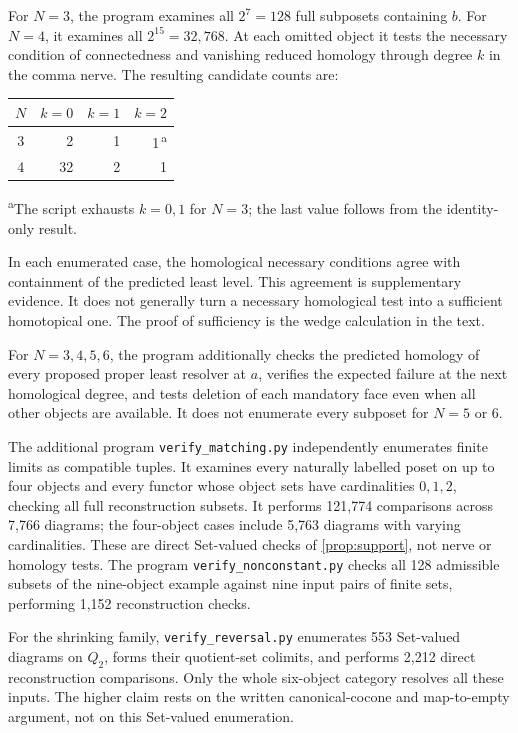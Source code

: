 For $N=3$, the program examines all $2^7=128$ full subposets
containing $b$. For $N=4$, it examines all $2^{15}=32{,}768$. At each
omitted object it tests the necessary condition of connectedness and
vanishing reduced homology through degree $k$ in the comma nerve. The
resulting candidate counts are:
\begin{center}
\begin{tabular}{@{}crrr@{}}
\toprule
$N$ & $k=0$ & $k=1$ & $k=2$\\
\midrule
3 & 2 & 1 & 1\textsuperscript{\,a}\\
4 & 32 & 2 & 1\\
\bottomrule
\end{tabular}\par
\smallskip
{\footnotesize\textsuperscript{a}The script exhausts $k=0,1$ for $N=3$;
the last value follows from the identity-only result.}
\end{center}
In each enumerated case, the homological necessary conditions agree with
containment of the predicted least level. This agreement is supplementary
evidence. It does not generally turn a necessary homological test into a
sufficient homotopical one. The proof of sufficiency is the wedge
calculation in the text.

For $N=3,4,5,6$, the program additionally checks the predicted homology
of every proposed proper least resolver at $a$, verifies the expected
failure at the next homological degree, and tests deletion of each
mandatory face even when all other objects are available. It does not
enumerate every subposet for $N=5$ or $6$.

The additional program \texttt{verify\_matching.py} independently
enumerates finite limits as compatible tuples. It examines every
naturally labelled poset on up to four objects and every functor whose
object sets have cardinalities $0,1,2$, checking all full reconstruction
subsets. It performs 121,774 comparisons across 7,766 diagrams; the
four-object cases include 5,763 diagrams with varying cardinalities.
These are direct Set-valued checks of \cref{prop:support}, not nerve
or homology tests. The program \texttt{verify\_nonconstant.py} checks
all 128 admissible subsets of the nine-object example against nine
input pairs of finite sets, performing 1,152 reconstruction checks.

For the shrinking family, \texttt{verify\_reversal.py} enumerates
553 Set-valued diagrams on $Q_2$, forms their quotient-set colimits,
and performs 2,212 direct reconstruction comparisons. Only the whole
six-object category resolves all these inputs. The higher claim rests
on the written canonical-cocone and map-to-empty argument, not on
this Set-valued enumeration.

